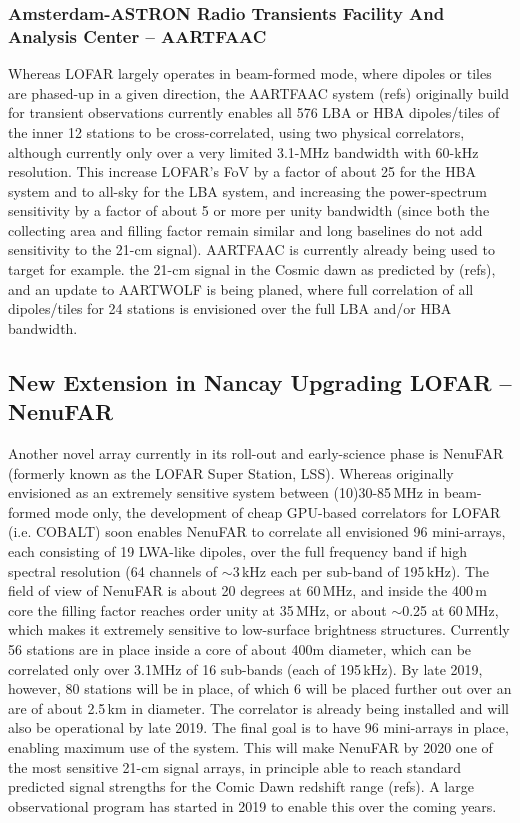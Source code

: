 \subsubsection{Amsterdam-ASTRON Radio Transients Facility And Analysis Center -- AARTFAAC}

Whereas LOFAR largely operates in beam-formed mode, where dipoles or tiles are phased-up in a given direction, the AARTFAAC system (refs) originally build for transient observations currently enables all 576 LBA or HBA dipoles/tiles of the inner 12 stations to be cross-correlated, using two physical correlators, although currently only over a very limited 3.1-MHz bandwidth with 60-kHz resolution. This increase LOFAR's FoV by a factor of about 25 for the HBA system and to all-sky for the LBA system, and increasing the power-spectrum sensitivity by a factor of about 5 or more per unity bandwidth (since both the collecting area and filling factor remain similar and long baselines do not add sensitivity to the 21-cm signal). AARTFAAC is currently already being used to target for example. the 21-cm signal in the Cosmic dawn as predicted by (refs), and an update to AARTWOLF is being planed, where full correlation of all dipoles/tiles for 24 stations is envisioned over the full LBA and/or HBA bandwidth.  

\subsection{New Extension in Nancay Upgrading LOFAR -- NenuFAR}

Another novel array currently in its roll-out and early-science phase is NenuFAR (formerly known as the LOFAR Super Station, LSS). Whereas originally envisioned as an extremely sensitive system between (10)30-85\,MHz in beam-formed mode only, the development of cheap GPU-based correlators for LOFAR (i.e. COBALT) soon enables NenuFAR to correlate all envisioned 96 mini-arrays, each consisting of 19 LWA-like dipoles, over the full frequency band if high spectral resolution (64 channels of $\sim$3\,kHz each per sub-band of 195\,kHz). The field of view of NenuFAR is about 20 degrees at 60\,MHz, and inside the 400\,m core the filling factor reaches order unity at 35\,MHz, or about $\sim$0.25 at 60\,MHz, which makes it extremely sensitive to low-surface brightness structures. Currently 56 stations are in place inside a core of about 400m diameter, which can be correlated only over 3.1MHz of 16 sub-bands (each of 195\,kHz). By late 2019, however, 80 stations will be in place, of which 6 will be placed further out over an are of about 2.5\,km in diameter. The correlator is already being installed and will also be operational by late 2019. The final goal is to have 96 mini-arrays in place, enabling maximum use of the system. This will make NenuFAR by 2020 one of the most sensitive 21-cm signal arrays, in principle able to reach standard predicted signal strengths for the Comic Dawn redshift range (refs). A large observational program has started in 2019 to enable this over the coming years.      

